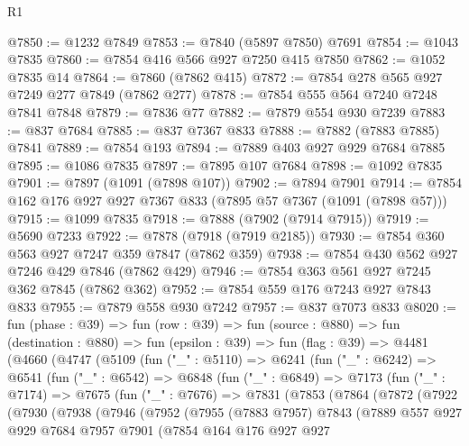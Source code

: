 \begin{lexlean}{R1}
\begin{coremodule}
@7850 := @1232 @7849
@7853 := @7840 (@5897 @7850) @7691
@7854 := @1043 @7835
@7860 := @7854 @416 @566 @927 @7250 @415 @7850
@7862 := @1052 @7835 @14
@7864 := @7860 (@7862 @415)
@7872 := @7854 @278 @565 @927 @7249 @277 @7849 (@7862 @277)
@7878 := @7854 @555 @564 @7240 @7248 @7841 @7848
@7879 := @7836 @77
@7882 := @7879 @554 @930 @7239
@7883 := @837 @7684
@7885 := @837 @7367 @833
@7888 := @7882 (@7883 @7885) @7841
@7889 := @7854 @193
@7894 := @7889 @403 @927 @929 @7684 @7885
@7895 := @1086 @7835
@7897 := @7895 @107 @7684
@7898 := @1092 @7835
@7901 := @7897 (@1091 (@7898 @107))
@7902 := @7894 @7901
@7914 := @7854 @162 @176 @927 @927 @7367 @833 (@7895 @57 @7367 (@1091 (@7898 @57)))
@7915 := @1099 @7835
@7918 := @7888 (@7902 (@7914 @7915))
@7919 := @5690 @7233
@7922 := @7878 (@7918 (@7919 @2185))
@7930 := @7854 @360 @563 @927 @7247 @359 @7847 (@7862 @359)
@7938 := @7854 @430 @562 @927 @7246 @429 @7846 (@7862 @429)
@7946 := @7854 @363 @561 @927 @7245 @362 @7845 (@7862 @362)
@7952 := @7854 @559 @176 @7243 @927 @7843 @833
@7955 := @7879 @558 @930 @7242
@7957 := @837 @7073 @833
@8020 := fun (phase : @39) =>
  fun (row : @39) =>
  fun (source : @880) =>
  fun (destination : @880) =>
  fun (epsilon : @39) =>
  fun (flag : @39) =>
  @4481
    (@4660
      (@4747
        (@5109
          (fun ("_" : @5110) =>
          @6241
            (fun ("_" : @6242) =>
            @6541
              (fun ("_" : @6542) =>
              @6848
                (fun ("_" : @6849) =>
                @7173
                  (fun ("_" : @7174) =>
                  @7675
                    (fun ("_" : @7676) =>
                    @7831
                      (@7853
                        (@7864
                          (@7872
                            (@7922
                              (@7930
                                (@7938
                                  (@7946
                                    (@7952
                                      (@7955
                                        (@7883 @7957)
                                        @7843
                                        (@7889
                                          @557
                                          @927
                                          @929
                                          @7684
                                          @7957
                                          @7901
                                          (@7854
                                            @164
                                            @176
                                            @927
                                            @927

\end{coremodule}
\end{lexlean}
